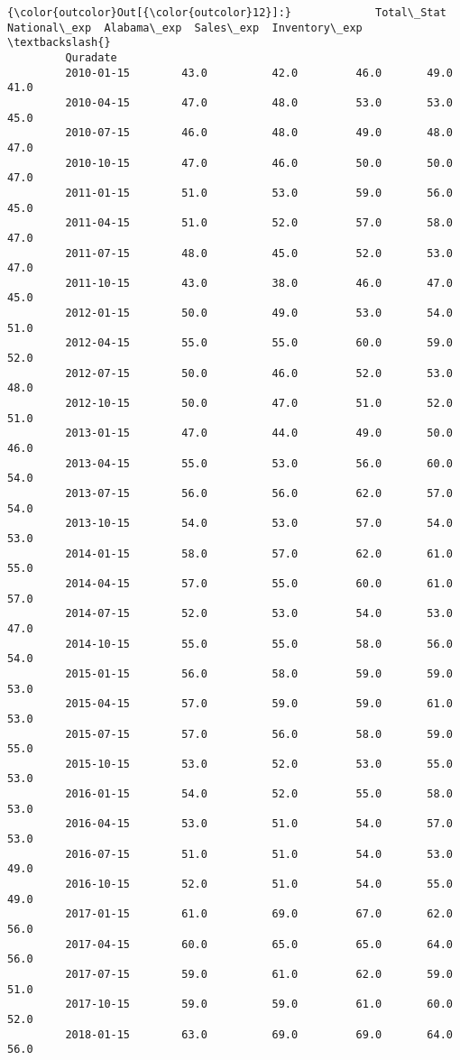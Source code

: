 \documentclass[11pt]{article}
\begin{document}
\begin{Verbatim}[commandchars=\\\{\}]
{\color{outcolor}Out[{\color{outcolor}12}]:}             Total\_Stat  National\_exp  Alabama\_exp  Sales\_exp  Inventory\_exp  \textbackslash{}
         Quradate                                                                      
         2010-01-15        43.0          42.0         46.0       49.0           41.0   
         2010-04-15        47.0          48.0         53.0       53.0           45.0   
         2010-07-15        46.0          48.0         49.0       48.0           47.0   
         2010-10-15        47.0          46.0         50.0       50.0           47.0   
         2011-01-15        51.0          53.0         59.0       56.0           45.0   
         2011-04-15        51.0          52.0         57.0       58.0           47.0   
         2011-07-15        48.0          45.0         52.0       53.0           47.0   
         2011-10-15        43.0          38.0         46.0       47.0           45.0   
         2012-01-15        50.0          49.0         53.0       54.0           51.0   
         2012-04-15        55.0          55.0         60.0       59.0           52.0   
         2012-07-15        50.0          46.0         52.0       53.0           48.0   
         2012-10-15        50.0          47.0         51.0       52.0           51.0   
         2013-01-15        47.0          44.0         49.0       50.0           46.0   
         2013-04-15        55.0          53.0         56.0       60.0           54.0   
         2013-07-15        56.0          56.0         62.0       57.0           54.0   
         2013-10-15        54.0          53.0         57.0       54.0           53.0   
         2014-01-15        58.0          57.0         62.0       61.0           55.0   
         2014-04-15        57.0          55.0         60.0       61.0           57.0   
         2014-07-15        52.0          53.0         54.0       53.0           47.0   
         2014-10-15        55.0          55.0         58.0       56.0           54.0   
         2015-01-15        56.0          58.0         59.0       59.0           53.0   
         2015-04-15        57.0          59.0         59.0       61.0           53.0   
         2015-07-15        57.0          56.0         58.0       59.0           55.0   
         2015-10-15        53.0          52.0         53.0       55.0           53.0   
         2016-01-15        54.0          52.0         55.0       58.0           53.0   
         2016-04-15        53.0          51.0         54.0       57.0           53.0   
         2016-07-15        51.0          51.0         54.0       53.0           49.0   
         2016-10-15        52.0          51.0         54.0       55.0           49.0   
         2017-01-15        61.0          69.0         67.0       62.0           56.0   
         2017-04-15        60.0          65.0         65.0       64.0           56.0   
         2017-07-15        59.0          61.0         62.0       59.0           51.0   
         2017-10-15        59.0          59.0         61.0       60.0           52.0   
         2018-01-15        63.0          69.0         69.0       64.0           56.0   
         

\end{Verbatim}
\end{document}
